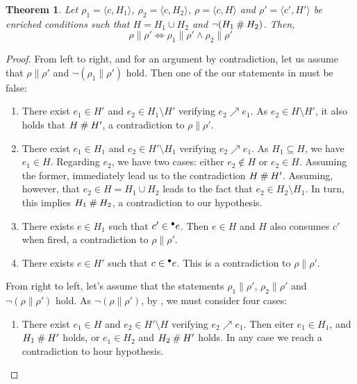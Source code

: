 \documentclass[12pt,a4paper]{article}
\newtheorem{theorem}{Theorem}
\newcommand{\confl}{\ensuremath\mathbin\#}
\begin{document}
\begin{theorem}
Let $\rho_1 = \langle c, H_1 \rangle$, $\rho_2 = \langle c, H_2 \rangle$, $\rho
= \langle c, H \rangle$ and $\rho' = \langle c', H' \rangle$ be enriched
conditions such that $H = H_1 \cup H_2$ and $\lnot (H_1 \confl H_2)$.  Then,
$$\rho \parallel \rho' \iff \rho_1 \parallel \rho' \land \rho_2 \parallel
\rho'$$
\end{theorem}

\begin{proof}
From left to right, and for an argument by contradiction, let us assume that
$\rho \parallel \rho'$ and $\lnot (\rho_1 \parallel \rho')$ hold.  Then one of
the our statements in  must be false:

\begin{enumerate}
\item There exist $e_1 \in H'$ and $e_2 \in H_1 \setminus H'$ verifying $e_2
\nearrow e_1$.  As $e_2 \in H \setminus H'$, it also holds that $H \confl H'$,
a contradiction to $\rho \parallel \rho'$.

\item There exist $e_1 \in H_1$ and $e_2 \in H' \setminus H_1$ verifying $e_2
\nearrow e_1$.  As $H_1 \subseteq H$, we have $e_1 \in H$.  Regarding $e_2$, we
have two cases: either $e_2 \notin H$ or $e_2 \in H$.  Assuming the former,
immediately lead us to the contradiction $H \confl H'$.  Assuming, however,
that $e_2 \in H = H_1 \cup H_2$ leads to the fact that $e_2 \in H_2 \setminus
H_1$.  In turn, this implies $H_1 \confl H_2$, a contradiction to our
hypothesis.

\item There exists $e \in H_1$ such that $c' \in {}^\bullet e$.  Then $e \in H$ and
$H$ also consumes $c'$ when fired, a contradiction to $\rho \parallel \rho'$.

\item There exists $e \in H'$ such that $c \in {}^\bullet e$.  This is a
contradiction to $\rho \parallel \rho'$.
\end{enumerate}

From right to left, let's assume that the statements $\rho_1 \parallel \rho'$,
$\rho_2 \parallel \rho'$ and $\lnot (\rho \parallel \rho')$ hold.  As $\lnot
(\rho \parallel \rho')$, by , we must consider four cases:

\begin{enumerate}
\item There exist $e_1 \in H$ and $e_2 \in H' \setminus H$ verifying $e_2
\nearrow e_1$.  Then eiter $e_1 \in H_1$, and $H_1 \confl H'$ holds, or $e_1
\in H_2$ and $H_2 \confl H'$ holds. In any case we reach a contradiction to
hour hypothesis.


\end{enumerate}
\end{proof}
\end{document}
